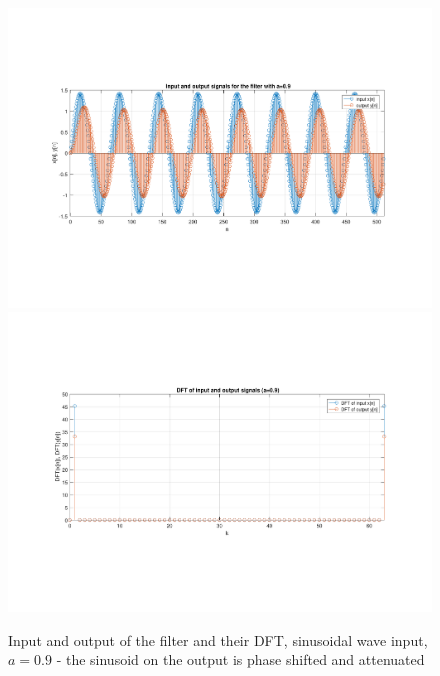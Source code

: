 \begin{figure} [H]
	\centering
	\includegraphics[trim={2.5cm 5cm 2.5cm 5cm}, clip, width=0.75\linewidth]{io_sin_7}
	\includegraphics[trim={2.5cm 5cm 2.5cm 5cm}, clip, width=0.75\linewidth]{dft_sin_7}
	\caption{Input and output of the filter and their DFT, sinusoidal wave input, $a=0.9$ - the sinusoid on the output is phase shifted and attenuated}
	\label{fig:t1_io_sin_7}
\end{figure}
